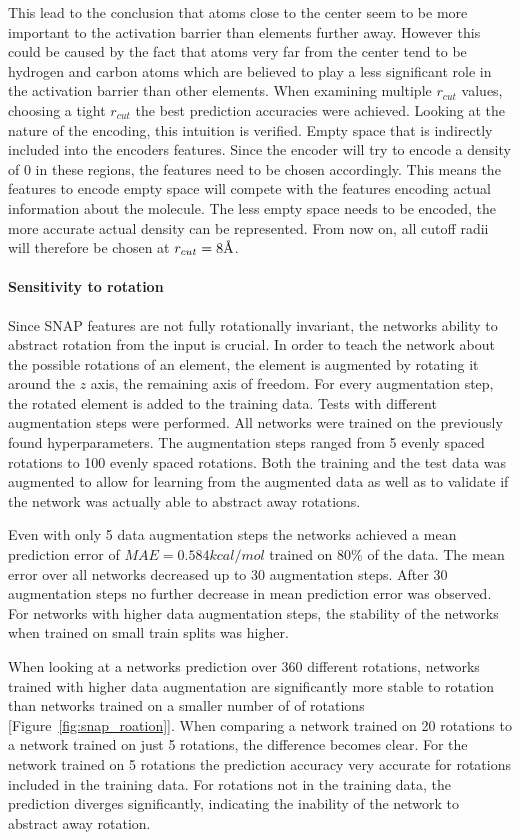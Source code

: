 This lead to the conclusion that atoms close to the center seem to be more important to the activation barrier than 
elements further away.
However this could be caused by the fact that atoms very far from the center tend to be hydrogen and carbon 
atoms which are believed to play a less significant role in the activation barrier than other elements.
When examining multiple $r_{cut}$ values, choosing a tight $r_{cut}$ the best prediction accuracies were achieved.
Looking at the nature of the encoding, this intuition is verified.
Empty space that is indirectly included into the encoders features.
Since the encoder will try to encode a density of 0 in these regions,
the features need to be chosen accordingly.
This means the features to encode empty space will compete with the features encoding
actual information about the molecule.
The less empty space needs to be encoded, the more accurate actual density can be represented.
From now on, all cutoff radii will therefore be chosen at $r_{cut} = 8 \AA$.


\paragraph{Sensitivity to rotation}
Since SNAP features are not fully rotationally invariant, the networks ability to abstract rotation from the input is crucial.
In order to teach the network about the possible rotations of an element, 
the element is augmented by rotating it around the $z$ axis, the remaining axis of freedom.
For every augmentation step, the rotated element is added to the training data.
Tests with different augmentation steps were performed.
All networks were trained on the previously found hyperparameters.
The augmentation steps ranged from 5 evenly spaced rotations to 100 evenly spaced rotations.
Both the training and the test data was augmented to allow for learning from the augmented data
as well as to validate if the network was actually able to abstract away rotations.

Even with only 5 data augmentation steps the networks achieved a mean prediction error of $MAE = 0.584 kcal/mol$ trained on 80\% of the data.
The mean error over all networks decreased up to 30 augmentation steps.
After 30 augmentation steps no further decrease in mean prediction error was observed.
For networks with higher data augmentation steps, the stability of the networks when trained on small train splits was higher.

When looking at a networks prediction over 360 different rotations, networks trained with higher data augmentation 
are significantly more stable to rotation than networks trained on a smaller number of of rotations [Figure~\ref{fig:snap_roation}].
When comparing a network trained on 20 rotations to a network trained on just 5 rotations,
the difference becomes clear.
For the network trained on 5 rotations the prediction accuracy very accurate for rotations included in the training data.
For rotations not in the training data, the prediction diverges significantly, indicating the inability of the network to abstract away rotation.

